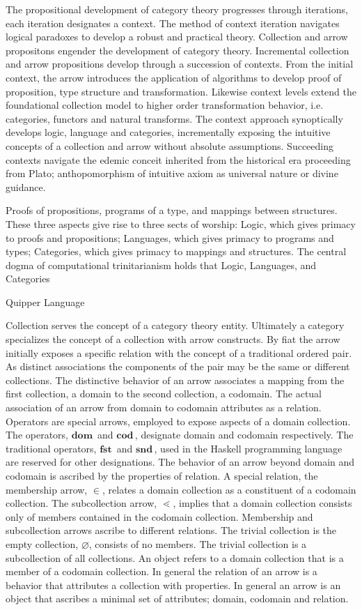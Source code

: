 \documentclass[aps,twocolumn,secnumarabic,nobalancelastpage,amsmath,amssymb,
amsthm,nofootinbib,parskip=full]{revtex4}
\numberwithin{equation}{section}
\newcommand{\oper}[1]{\mathbf{#1}\,}
\begin{document}
The propositional development of category theory progresses
through iterations, each iteration designates a context.
The method of context iteration navigates logical paradoxes 
to develop a robust and practical theory.
Collection and arrow propositons engender the development of category theory.
Incremental collection and arrow propositions develop through a
succession of contexts.
From the initial context, the arrow introduces the application of algorithms
to develop proof of proposition, type structure and transformation.
Likewise context levels extend the foundational collection model
to higher order transformation behavior, i.e.
categories, functors and natural transforms.
The context approach synoptically develops logic, language and categories,
incrementally exposing the intuitive concepts of a collection and
arrow without absolute assumptions.
Succeeding contexts navigate the edemic conceit inherited from the
historical era proceeding from Plato; anthopomorphism of intuitive axiom as
universal nature or divine guidance.

Proofs of propositions, programs of a type, and mappings between structures.  These three aspects give rise to three sects of worship: Logic, which gives primacy to proofs and propositions; Languages, which gives primacy to programs and types; Categories, which gives primacy to mappings and structures.  The central dogma of computational trinitarianism holds that Logic, Languages, and Categories

Quipper Language

Collection serves the concept of a category theory entity.
Ultimately a category specializes the concept of a collection with
arrow constructs.
By fiat the arrow initially exposes a specific relation with the
concept of a traditional ordered pair.
As distinct associations the components of the pair may be the same
or different collections.
The distinctive behavior of an arrow associates a mapping from the first
collection, a domain to the second collection, a codomain.
The actual association of an arrow from domain to codomain attributes as a
relation.
Operators are special arrows, employed to expose aspects of a domain
collection.
The operators, $\oper{dom}$ and $\oper{cod}$, designate domain and codomain
respectively. The traditional operators, $\oper{fst}$ and $\oper{snd}$,
used in the Haskell programming language are reserved for other designations.
The behavior of an arrow beyond domain and codomain is ascribed by
the properties of relation.
A special relation, the membership arrow, $\in$, relates
a domain collection as a constituent of a codomain collection.
The subcollection arrow, $\lessdot$, implies
that a domain collection consists only of members contained in the codomain
collection.
Membership and subcollection arrows ascribe to different relations.
The trivial collection is the empty collection, $\varnothing$,
consists of no members. The trivial collection is a subcollection
of all collections.
An object refers to a domain collection that is a
member of a codomain collection. In general the relation of
an arrow is a behavior that attributes a collection with properties.
In general an arrow is an object that ascribes a minimal set of attributes;
domain, codomain and relation.
\end{document}
